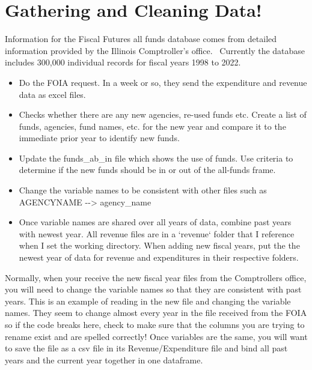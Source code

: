 \documentclass[
  letterpaper,
  DIV=11,
  numbers=noendperiod]{scrreport}
\providecommand{\tightlist}{%
  \setlength{\itemsep}{0pt}\setlength{\parskip}{0pt}}\usepackage{longtable,booktabs,array}
\begin{document}
\markright{}


\hypertarget{sec-gathering-and-cleaning-data}{%
\chapter{Gathering and Cleaning
Data!}\label{sec-gathering-and-cleaning-data}}

Information for the Fiscal Futures all funds database comes from
detailed information provided by the Illinois Comptroller's office.~
Currently the database includes 300,000 individual records for fiscal
years 1998 to 2022.

\begin{itemize}
\tightlist
\item
  Do the FOIA request. In a week or so, they send the expenditure and
  revenue data as excel files.
\item
  Checks whether there are any new agencies, re-used funds etc. Create a
  list of funds, agencies, fund names, etc. for the new year and compare
  it to the immediate prior year to identify new funds.
\item
  Update the funds\_ab\_in file which shows the use of funds. Use
  criteria to determine if the new funds should be in or out of the
  all-funds frame.
\item
  Change the variable names to be consistent with other files such as
  AGENCYNAME -\/-\textgreater{} agency\_name
\item
  Once variable names are shared over all years of data, combine past
  years with newest year. All revenue files are in a `revenue` folder
  that I reference when I set the working directory. When adding new
  fiscal years, put the the newest year of data for revenue and
  expenditures in their respective folders.
\end{itemize}

Normally, when your receive the new fiscal year files from the
Comptrollers office, you will need to change the variable names so that
they are consistent with past years. This is an example of reading in
the new file and changing the variable names. They seem to change almost
every year in the file received from the FOIA so if the code breaks
here, check to make sure that the columns you are trying to rename exist
and are spelled correctly! Once variables are the same, you will want to
save the file as a csv file in its Revenue/Expenditure file and bind all
past years and the current year together in one dataframe.
\end{document}
